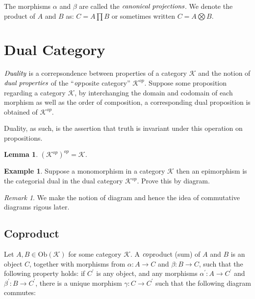 \documentclass[10pt, oneside, reqno]{amsart}
\theoremstyle{plain}%
\newtheorem{lem}[thm]{Lemma}
\theoremstyle{definition}
\newtheorem{exmp}[thm]{Example}
\theoremstyle{remark}
\newtheorem*{rem}{Remark}
\begin{document}
The morphisms $\alpha$ and $\beta$ are called the $\emph{canonical projections}$.
We denote the product of $A$ and $B$ as: $C = A \prod B$ or sometimes written $C = A \bigotimes B$.

\section{Dual Category} %
\label{sec:dualcategory}
$\emph{Duality}$ is a correpsondence between properties of a category $\mathcal{K}$ and the notion
of $\emph{dual properties}$ of the ``$\emph{op}$posite category'' $\mathcal{K}^{op}$. Suppose some proposition
regarding a category $\mathcal{K}$, by interchanging the domain and codomain of each morphism as well as
the order of composition, a corresponding dual proposition is obtained of $\mathcal{K}^{op}$.

Duality, as such, is the assertion that truth is invariant under this operation on propositions.
\begin{lem}
 $(\mathcal{K}^{op})^{op} = \mathcal{K}$.
\end{lem}

\begin{exmp}
 Suppose a monomorphism in a category $\mathcal{K}$ then an epimorphism is the categorial dual
 in the dual category $\mathcal{K}^{op}$. Prove this by diagram.
\end{exmp}

\begin{rem}
 We make the notion of diagram and hence the idea of commutative diagrams rigous later.
\end{rem}

\subsection{Coproduct} %
\label{subsec:coproduct}
Let $A,B \in \text{Ob}(\mathcal{K})$ for some category $\mathcal{K}$.
A $\emph{co}$product (sum) of $A$ and $B$ is an object $C$, together with morphisms from
$\alpha: A \to C$ and $\beta: B \to C$, such that the following property holds:
if $C^{'}$ is any object, and any morphisms $\alpha^{'}: A \to C^{'}$ and $\beta^{'}: B \to C^{'}$,
there is a unique morphism $\gamma: C \to C^{'}$ such that the following diagram commutes:

\end{document}
